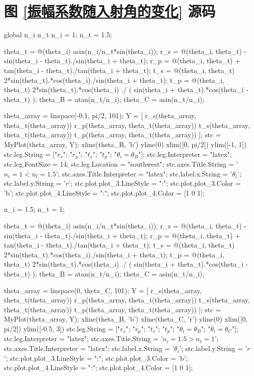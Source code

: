 \documentclass[UTF8]{report}
\theoremstyle{MyLineTheoremStyle} %
\theoremstyle{MyBlockTheoremStyle} %
\theoremstyle{MySubsubsectionStyle} %
\begin{document}
\section{图 \ref{振幅系数随入射角的变化} 源码}
\begin{matlablisting}
global n_i n_t
n_i = 1;
n_t = 1.5;

theta_t = @(theta_i) asin(n_i/n_t*sin(theta_i));
r_s = @(theta_i, theta_t) - sin(theta_i - theta_t)./sin(theta_i + theta_t);
r_p = @(theta_i, theta_t) + tan(theta_i - theta_t)./tan(theta_i + theta_t);
t_s = @(theta_i, theta_t) 2*sin(theta_t).*cos(theta_i)./sin(theta_i + theta_t);
t_p = @(theta_i, theta_t) 2*sin(theta_t).*cos(theta_i) ./ ( sin(theta_i + theta_t).*cos(theta_i - theta_t) );
theta_B = atan(n_t/n_i);
theta_C = asin(n_t/n_i);

theta_array = linspace(-0.1, pi/2, 101);
Y = [
    r_s(theta_array, theta_t(theta_array))
    r_p(theta_array, theta_t(theta_array))
    t_s(theta_array, theta_t(theta_array))
    t_p(theta_array, theta_t(theta_array))
    ];
stc = MyPlot(theta_array, Y);
xline(theta_B, 'b')
yline(0)
xlim([0, pi/2])
ylim([-1, 1])
stc.leg.String = ["$r_s$"; "$r_p$"; "$t_s$"; "$t_p$"; "$\theta_i = \theta_B$"];
stc.leg.Interpreter = "latex";
stc.leg.FontSize = 14;
stc.leg.Location = "southwest";
stc.axes.Title.String = '$n_i = 1 < n_t = 1.5$';
stc.axes.Title.Interpreter = "latex";
stc.label.x.String = '$\theta_i$';
stc.label.y.String = '$r$';
stc.plot.plot_3.LineStyle = ":";
stc.plot.plot_3.Color = 'b';
stc.plot.plot_4.LineStyle = ":";
stc.plot.plot_4.Color = [1 0 1];

n_i = 1.5;
n_t = 1;

theta_t = @(theta_i) asin(n_i/n_t*sin(theta_i));
r_s = @(theta_i, theta_t) - sin(theta_i - theta_t)./sin(theta_i + theta_t);
r_p = @(theta_i, theta_t) + tan(theta_i - theta_t)./tan(theta_i + theta_t);
t_s = @(theta_i, theta_t) 2*sin(theta_t).*cos(theta_i)./sin(theta_i + theta_t);
t_p = @(theta_i, theta_t) 2*sin(theta_t).*cos(theta_i) ./ ( sin(theta_i + theta_t).*cos(theta_i - theta_t) );
theta_B = atan(n_t/n_i);
theta_C = asin(n_t/n_i);


theta_array = linspace(0, theta_C, 101);
Y = [
    r_s(theta_array, theta_t(theta_array))
    r_p(theta_array, theta_t(theta_array))
    t_s(theta_array, theta_t(theta_array))
    t_p(theta_array, theta_t(theta_array))
    ];
stc = MyPlot(theta_array, Y);
xline(theta_B, 'b')
xline(theta_C, 'r')
yline(0)
xlim([0, pi/2])
ylim([-0.5, 3])
stc.leg.String = ["$r_s$"; "$r_p$"; "$t_s$"; "$t_p$"; "$\theta_i = \theta_B$"; "$\theta_i = \theta_C$"];
stc.leg.Interpreter = "latex";
stc.axes.Title.String = '$n_i = 1.5 > n_t = 1$';
stc.axes.Title.Interpreter = "latex";
stc.label.x.String = '$\theta_i$';
stc.label.y.String = '$r$';
stc.plot.plot_3.LineStyle = ":";
stc.plot.plot_3.Color = 'b';
stc.plot.plot_4.LineStyle = ":";
stc.plot.plot_4.Color = [1 0 1];
\end{matlablisting}
\end{document}
